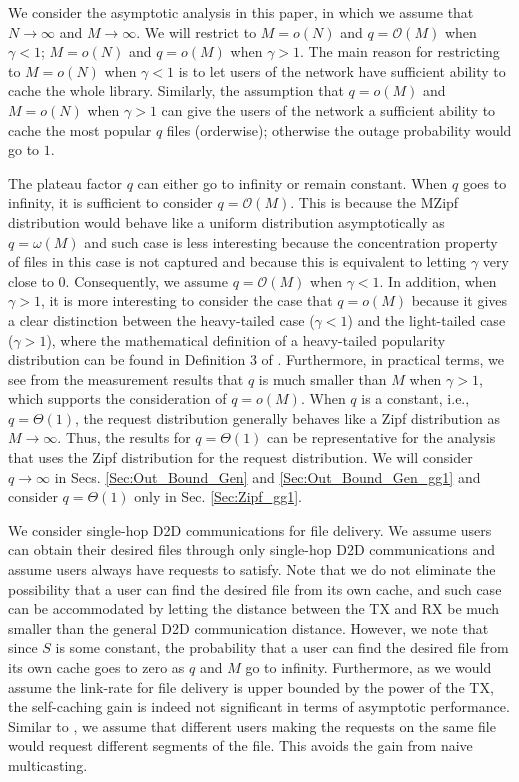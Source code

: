 \documentclass[journal,draftclsnofoot,onecolumn,12pt,twoside]{IEEEtran}
\begin{document}
We consider the asymptotic analysis in this paper, in which we assume that $N\to\infty$ and $M\to\infty$. We will restrict to $M=o(N)$ and $q=\mathcal{O}(M)$ when $\gamma<1$; $M=o(N)$ and $q=o(M)$ when $\gamma>1$. The main reason for restricting to $M=o(N)$ when $\gamma<1$ is to let users of the network have sufficient ability to cache the whole library. Similarly, the assumption that $q=o(M)$ and $M=o(N)$ when $\gamma>1$ can give the users of the network a sufficient ability to cache the most popular $q$ files (orderwise); otherwise the outage probability would go to $1$.

The plateau factor $q$ can either go to infinity or remain constant. When $q$ goes to infinity, it is sufficient to consider $q=\mathcal{O}(M)$. This is because the MZipf distribution would behave like a uniform distribution asymptotically as $q=\omega(M)$ and such case is
less interesting because the concentration property of files in this case is not captured and because this is equivalent to letting $\gamma$ very close to 0. Consequently, we assume $q=\mathcal{O}(M)$ when $\gamma<1$. In addition, when $\gamma>1$, it is more interesting to consider the case that $q=o(M)$ because it gives a clear distinction between the heavy-tailed case ($\gamma<1$) and the light-tailed case ($\gamma>1$), where the mathematical definition of a heavy-tailed popularity distribution can be found in Definition 3 of \cite{jeon2017wireless}. Furthermore, in practical terms, we see from the measurement results \cite{lee2019throughput} that $q$ is much smaller than $M$ when $\gamma>1$, which supports the consideration of $q=o(M)$. When $q$ is a constant, i.e., $q=\Theta(1)$, the request distribution generally behaves like a Zipf distribution as $M\to\infty$. Thus, the results for $q=\Theta(1)$ can be representative for the analysis that uses the Zipf distribution for the request distribution. We will consider $q\to\infty$ in Secs. \ref{Sec:Out_Bound_Gen} and \ref{Sec:Out_Bound_Gen_gg1} and consider $q=\Theta(1)$ only in Sec. \ref{Sec:Zipf_gg1}. 

We consider single-hop D2D communications for file delivery. We assume users can obtain their desired files through only single-hop D2D communications and assume users always have requests to satisfy. Note that we do not eliminate the possibility that a user can find the desired file from its own cache, and such case can be accommodated by letting the distance between the TX and RX be much smaller than the general D2D communication distance. However, we note that since $S$ is some constant, the probability that a user can find the desired file from its own cache goes to zero as $q$ and $M$ go to infinity. Furthermore, as we would assume the link-rate for file delivery is upper bounded by the power of the TX, the self-caching gain is indeed not significant in terms of asymptotic performance. Similar to \cite{Ji:Th_Out_toff}, we assume that different users making the requests on the same file would request different segments of the file. This avoids the gain from naive multicasting.
\end{document}
